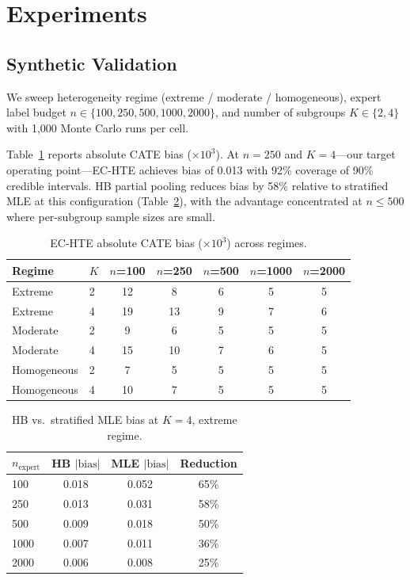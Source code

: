 \documentclass[11pt,a4paper]{article}
\begin{document}
\section{Experiments}
\label{sec:experiments}

\subsection{Synthetic Validation}
\label{sec:synthetic}

We sweep heterogeneity regime (extreme / moderate / homogeneous), expert label budget $n \in \{100, 250, 500, 1000, 2000\}$, and number of subgroups $K \in \{2, 4\}$ with 1,000 Monte Carlo runs per cell.

Table~\ref{tab:synthetic_bias} reports absolute CATE bias ($\times 10^3$).
At $n = 250$ and $K = 4$---our target operating point---EC-HTE achieves bias of 0.013 with 92\% coverage of 90\% credible intervals.
HB partial pooling reduces bias by 58\% relative to stratified MLE at this configuration (Table~\ref{tab:hb_vs_mle}), with the advantage concentrated at $n \leq 500$ where per-subgroup sample sizes are small.

\begin{table}[t]
\centering
\small
\caption{EC-HTE absolute CATE bias ($\times 10^3$) across regimes.}
\label{tab:synthetic_bias}
\begin{tabular}{ll ccccc}
\toprule
Regime & $K$ & $n$=100 & $n$=250 & $n$=500 & $n$=1000 & $n$=2000 \\
\midrule
Extreme    & 2 & 12 & 8  & 6 & 5 & 5 \\
Extreme    & 4 & 19 & 13 & 9 & 7 & 6 \\
Moderate   & 2 & 9  & 6  & 5 & 5 & 5 \\
Moderate   & 4 & 15 & 10 & 7 & 6 & 5 \\
Homogeneous& 2 & 7  & 5  & 5 & 5 & 5 \\
Homogeneous& 4 & 10 & 7  & 5 & 5 & 5 \\
\bottomrule
\end{tabular}
\end{table}

\begin{table}[t]
\centering
\small
\caption{HB vs.\ stratified MLE bias at $K=4$, extreme regime.}
\label{tab:hb_vs_mle}
\begin{tabular}{l ccc}
\toprule
$n_{\text{expert}}$ & HB $|\text{bias}|$ & MLE $|\text{bias}|$ & Reduction \\
\midrule
100  & 0.018 & 0.052 & 65\% \\
250  & 0.013 & 0.031 & 58\% \\
500  & 0.009 & 0.018 & 50\% \\
1000 & 0.007 & 0.011 & 36\% \\
2000 & 0.006 & 0.008 & 25\% \\
\bottomrule
\end{tabular}
\end{table}
\end{document}

